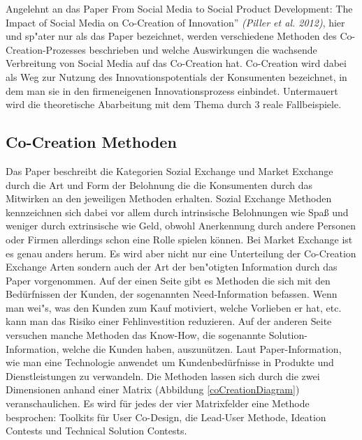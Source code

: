 Angelehnt an das  Paper \glqq From Social Media to Social Product Development: The Impact of Social Media on Co-Creation of Innovation'' \textit{(Piller et al. 2012)}\cite{mainreference}, hier und sp"ater nur als das Paper bezeichnet, werden verschiedene Methoden des Co-Creation-Prozesses beschrieben und welche Auswirkungen die wachsende Verbreitung von Social Media auf das Co-Creation hat. Co-Creation wird dabei als Weg zur Nutzung des Innovationspotentials der Konsumenten bezeichnet, in dem man sie in den firmeneigenen Innovationsprozess einbindet. Untermauert wird die theoretische Abarbeitung mit dem Thema durch 3 reale Fallbeispiele.

\subsection{Co-Creation Methoden}
Das Paper beschreibt die Kategorien Sozial Exchange und Market Exchange durch die Art und Form der Belohnung die die Konsumenten durch das Mitwirken an den jeweiligen Methoden erhalten. Sozial Exchange Methoden kennzeichnen sich dabei vor allem durch intrinsische Belohnungen wie Spa\ss{} und weniger durch extrinsische wie Geld, obwohl Anerkennung durch andere Personen oder Firmen allerdings  schon eine Rolle spielen k\"onnen. Bei Market Exchange ist es genau anders herum. Es wird aber nicht nur eine Unterteilung der Co-Creation Exchange Arten sondern auch der Art der ben"otigten Information durch das Paper vorgenommen.
Auf der einen Seite gibt es Methoden die sich mit den Bed\"urfnissen der Kunden, der sogenannten Need-Information befassen. Wenn man wei"s, was den Kunden zum Kauf motiviert, welche Vorlieben er hat, etc. kann man das Risiko einer Fehlinvestition reduzieren. Auf der anderen Seite versuchen manche Methoden das Know-How, die sogenannte Solution-Information, welche die Kunden haben, auszun\"utzen.
Laut Paper-Information, wie man eine Technologie anwendet um Kundenbed\"urfnisse in Produkte und Dienstleistungen zu verwandeln. 
 Die Methoden lassen sich durch die zwei Dimensionen anhand einer Matrix (Abbildung \ref{coCreationDiagram}) veranschaulichen. Es wird f\"ur jedes der vier Matrixfelder eine Methode besprochen: Toolkits f\"ur User Co-Design, die Lead-User Methode, Ideation Contests und Technical Solution Contests.
\pagebreak
